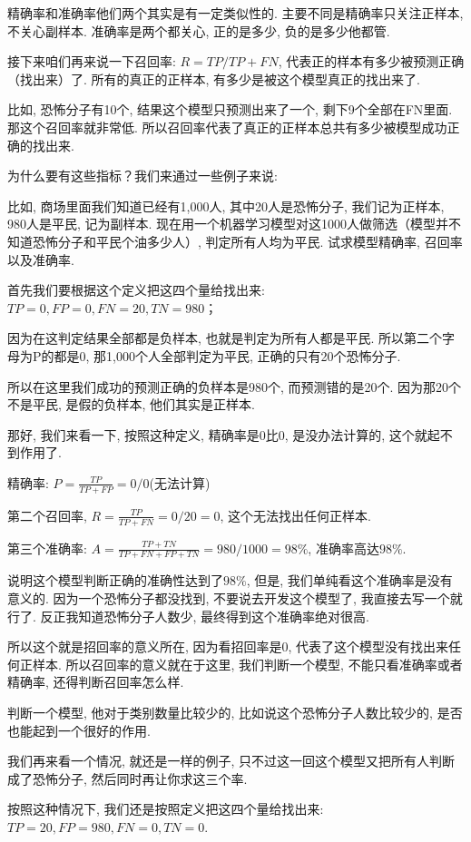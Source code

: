精确率和准确率他们两个其实是有一定类似性的. 主要不同是精确率只关注正样本, 不关心副样本. 准确率是两个都关心, 正的是多少, 负的是多少他都管. 

接下来咱们再来说一下召回率: $R=TP/TP+FN$, 代表正的样本有多少被预测正确（找出来）了. 所有的真正的正样本, 有多少是被这个模型真正的找出来了. 

比如, 恐怖分子有10个, 结果这个模型只预测出来了一个, 剩下9个全部在FN里面. 那这个召回率就非常低. 所以召回率代表了真正的正样本总共有多少被模型成功正确的找出来. 

为什么要有这些指标？我们来通过一些例子来说: 

比如, 商场里面我们知道已经有1,000人, 其中20人是恐怖分子, 我们记为正样本, 980人是平民, 记为副样本. 现在用一个机器学习模型对这1000人做筛选（模型并不知道恐怖分子和平民个油多少人）, 判定所有人均为平民. 试求模型精确率, 召回率以及准确率. 

首先我们要根据这个定义把这四个量给找出来: $TP=0, FP=0, FN=20, TN=980$；

因为在这判定结果全部都是负样本, 也就是判定为所有人都是平民. 所以第二个字母为P的都是0, 那1,000个人全部判定为平民, 正确的只有20个恐怖分子. 

所以在这里我们成功的预测正确的负样本是980个, 而预测错的是20个. 因为那20个不是平民, 是假的负样本, 他们其实是正样本. 

那好, 我们来看一下, 按照这种定义, 精确率是0比0, 是没办法计算的, 这个就起不到作用了. 

精确率: $P=\frac{TP}{TP+FP} = 0/0$(无法计算)

第二个召回率, $R=\frac{TP}{TP+FN} = 0/20 = 0$, 这个无法找出任何正样本. 

第三个准确率: $A=\frac{TP+TN}{TP+FN+FP+TN} = 980/1000 = 98\%$, 准确率高达$98\%$. 

说明这个模型判断正确的准确性达到了$98\%$, 但是, 我们单纯看这个准确率是没有意义的. 因为一个恐怖分子都没找到, 不要说去开发这个模型了, 我直接去写一个就行了. 反正我知道恐怖分子人数少, 最终得到这个准确率绝对很高. 

所以这个就是招回率的意义所在, 因为看招回率是0, 代表了这个模型没有找出来任何正样本. 所以召回率的意义就在于这里, 我们判断一个模型, 不能只看准确率或者精确率, 还得判断召回率怎么样. 

判断一个模型, 他对于类别数量比较少的, 比如说这个恐怖分子人数比较少的, 是否也能起到一个很好的作用. 

我们再来看一个情况, 就还是一样的例子, 只不过这一回这个模型又把所有人判断成了恐怖分子, 然后同时再让你求这三个率. 

按照这种情况下, 我们还是按照定义把这四个量给找出来: $TP=20, FP=980, FN=0, TN=0$. 


